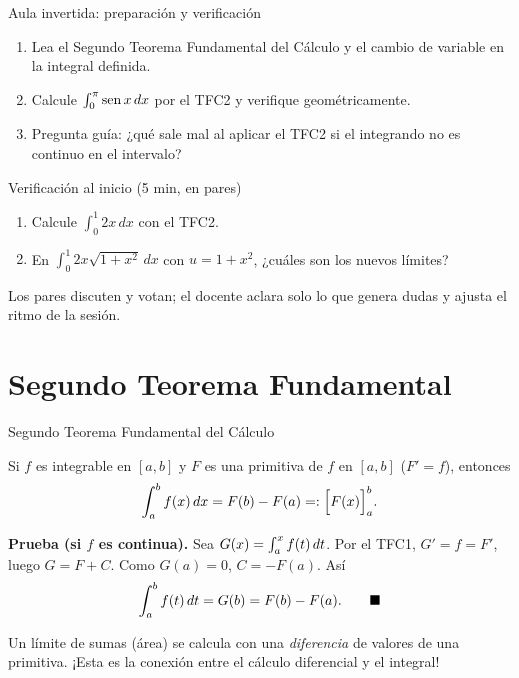 \documentclass[10pt,aspectratio=169]{beamer}
\begin{document}
\begin{frame}{Aula invertida: preparación y verificación}
  \small
  \begin{previa}
    \begin{enumerate}
      \item Lea el Segundo Teorema Fundamental del Cálculo y el cambio de variable en la integral definida.
      \item Calcule $\int_0^\pi\operatorname{sen} x\,dx$ por el TFC2 y verifique geométricamente.
      \item Pregunta guía: ¿qué sale mal al aplicar el TFC2 si el integrando no es continuo en el intervalo?
    \end{enumerate}
  \end{previa}
  \begin{block}{Verificación al inicio (5 min, en pares)}
    \begin{enumerate}
      \item Calcule $\int_0^1 2x\,dx$ con el TFC2.
      \item En $\int_0^1 2x\sqrt{1+x^2}\,dx$ con $u=1+x^2$, ¿cuáles son los nuevos límites?
    \end{enumerate}
    Los pares discuten y votan; el docente aclara solo lo que genera dudas y ajusta el ritmo de la sesión.
  \end{block}
\end{frame}

\section{Segundo Teorema Fundamental}

\begin{frame}{Segundo Teorema Fundamental del Cálculo}
  \begin{teorema}
    Si $f$ es integrable en $[a,b]$ y $F$ es una primitiva de $f$ en $[a,b]$ ($F'=f$), entonces
    \[ \int_a^bf(x)\,dx=F(b)-F(a)=:\Big[F(x)\Big]_a^b. \]
  \end{teorema}
  \textbf{Prueba (si $f$ es continua).} Sea $G(x)=\int_a^xf(t)\,dt$. Por el TFC1, $G'=f=F'$, luego
  $G=F+C$. Como $G(a)=0$, $C=-F(a)$. Así
  \[ \int_a^bf(t)\,dt=G(b)=F(b)-F(a).\qquad\blacksquare \]
  \begin{idea}
    Un límite de sumas (área) se calcula con una \emph{diferencia} de valores de una primitiva.
    ¡Esta es la conexión entre el cálculo diferencial y el integral!
  \end{idea}
\end{frame}
\end{document}
